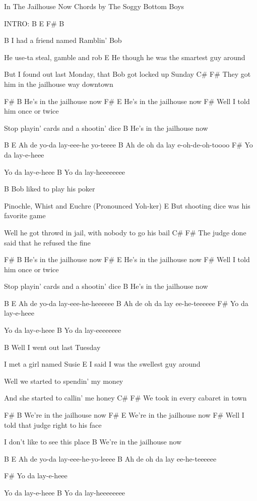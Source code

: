 
In The Jailhouse Now Chords
by The Soggy Bottom Boys


INTRO: B E F# B

B
I had a friend named Ramblin' Bob
          
He use-ta steal, gamble and rob
                                   E
He though he was the smartest guy around

But I found out last Monday, that Bob got locked up Sunday
     C#                               F#
They got him in the jailhouse way downtown


F#                    B
He's in the jailhouse now
F#                    E
He's in the jailhouse now
        F#
Well I told him once or twice

Stop playin' cards and a shootin' dice
                       B
He's in the jailhouse now

B           E 
Ah de yo-da lay-eee-he yo-teeee
            B
Ah de oh da lay e-oh-de-oh-toooo
      F#
Yo da lay-e-heee

Yo da lay-e-heee
      B
Yo da lay-heeeeeeee


B
Bob liked to play his poker 

Pinochle, Whist and Euchre (Pronounced Yoh-ker)
                                    E
But shooting dice was his favorite game

Well he got throwd in jail, with nobody to go his bail
     C#                                  F#
The judge done said that he refused the fine



F#                     B
He's in the jailhouse now 
F#                     E
He's in the jailhouse now
       F#
Well I told him once or twice 

Stop playin' cards and a shootin' dice
                       B
He's in the jailhouse now

B            E
Ah de yo-da lay-eee-he-heeeeee 
             B
Ah de oh da lay ee-he-teeeeee
       F#
Yo da lay-e-heee

Yo da lay-e-heee
       B
Yo da lay-eeeeeeee


B
Well I went out last Tuesday 

I met a girl named Susie
                              E
I said I was the swellest guy around

Well we started to spendin' my money

And she started to callin' me honey
   C#                       F#
We took in every cabaret in town


F#                     B
We're in the jailhouse now
F#                     E
We're in the jailhouse now
       F#
Well I told that judge right to his face

I don't like to see this place
                       B
We're in the jailhouse now

B            E
Ah de yo-da lay-eee-he-yo-leeee 
            B
Ah de oh da lay ee-he-teeeeee

      F#
Yo da lay-e-heee

Yo da lay-e-heee
      B
Yo da lay-heeeeeeee



